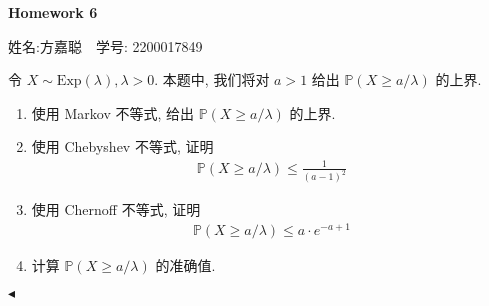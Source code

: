 \documentclass[11pt]{article}
\newenvironment{problem}[2][Problem]{\begin{trivlist}
    \item[\hskip \labelsep {\bfseries #1}\hskip \labelsep {\bfseries #2.}]\songti}{\hfill$\blacktriangleleft$\end{trivlist}}
\newcommand\1{\mathds{1}}
\newcommand\PP{\mathbb{P}}
\newcommand{\Exp}{\mathrm{Exp}}
\begin{document}
\kaishu

\pagestyle{fancy}
\chead{}
\fancyfoot[R]{} 
\fancyfoot[C]{\thepage\ /\ \pageref{LastPage} \\ \textcolor{lightgray}{最后编译时间: \today}}


\begin{center}
    {\LARGE \bf Homework 6}

    {姓名:方嘉聪\ \  学号: 2200017849}            %
\end{center}


\begin{problem}{1}
    令 $X\sim \Exp(\lambda), \lambda > 0$. 本题中, 我们将对 $a>1$ 给出 $\PP(X\ge a/\lambda)$ 的上界.
    \begin{enumerate}[label=(\arabic*)]
        \item 使用 Markov 不等式, 给出 $\PP(X\ge a/\lambda)$ 的上界.
        \item 使用 Chebyshev 不等式, 证明
        \begin{align*}
            \PP(X\ge a/\lambda) \le \frac{1}{(a-1)^2}
        \end{align*}
        \item 使用 Chernoff 不等式, 证明
        \begin{align*}
            \PP(X\ge a/\lambda) \le a \cdot e^{-a+1}
        \end{align*}
        \item 计算 $\PP(X\ge a/\lambda)$ 的准确值.
    \end{enumerate}
\end{problem}
\end{document}
